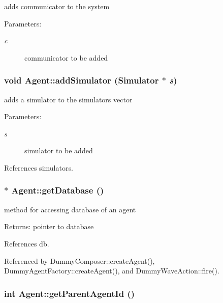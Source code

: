 adds communicator to the system \begin{Desc}
\item[Parameters:]
\begin{description}
\item[{\em c}]communicator to be added \end{description}
\end{Desc}
\subsubsection[addSimulator]{\setlength{\rightskip}{0pt plus 5cm}void Agent::addSimulator ({\bf Simulator} $\ast$ {\em s})}\label{classAgent_5c0b83894065bd48801026269297c7d4}


adds a simulator to the simulators vector \begin{Desc}
\item[Parameters:]
\begin{description}
\item[{\em s}]simulator to be added \end{description}
\end{Desc}


References simulators.
\subsubsection[getDatabase]{ $\ast$ Agent::getDatabase ()}\label{classAgent_0c519f2d6f07d246ca885505a85beeca}


method for accessing database of an agent \begin{Desc}
\item[Returns:]pointer to database \end{Desc}


References db.

Referenced by DummyComposer::createAgent(), DummyAgentFactory::createAgent(), and DummyWaveAction::fire().
\subsubsection[getParentAgentId]{\setlength{\rightskip}{0pt plus 5cm}int Agent::getParentAgentId ()}\label{classAgent_8de37825f8cff0ff899bdf15e546ada7}


